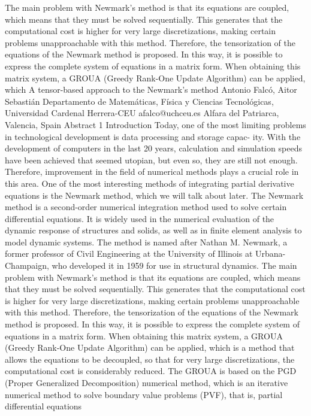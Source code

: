 \documentclass[a4paper, 10pt]{article}
\begin{document}
The main problem with Newmark's method is that its equations are coupled, which means that they must be solved sequentially. This generates that the computational cost is higher for very large discretizations, making certain problems unapproachable with this method. Therefore, the tensorization of the equations of the Newmark method is proposed. In this way, it is possible to express the complete system of equations in a matrix form. When obtaining this matrix system, a GROUA (Greedy Rank-One Update Algorithm) can be applied, which 
A tensor-based approach to the Newmark’s method
Antonio Falcó, Aitor Sebastián
Departamento de Matemáticas, Física y Ciencias Tecnológicas, Universidad Cardenal Herrera-CEU
afalco@uchceu.es
Alfara del Patriarca, Valencia, Spain
Abstract
1 Introduction
Today, one of the most limiting problems in technological development is data processing and storage capac-
ity. With the development of computers in the last 20 years, calculation and simulation speeds have been
achieved that seemed utopian, but even so, they are still not enough. Therefore, improvement in the field
of numerical methods plays a crucial role in this area. One of the most interesting methods of integrating
partial derivative equations is the Newmark method, which we will talk about later.
The Newmark method is a second-order numerical integration method used to solve certain differential
equations. It is widely used in the numerical evaluation of the dynamic response of structures and solids,
as well as in finite element analysis to model dynamic systems. The method is named after Nathan M.
Newmark, a former professor of Civil Engineering at the University of Illinois at Urbana-Champaign, who
developed it in 1959 for use in structural dynamics.
The main problem with Newmark’s method is that its equations are coupled, which means that they must
be solved sequentially. This generates that the computational cost is higher for very large discretizations,
making certain problems unapproachable with this method. Therefore, the tensorization of the equations of
the Newmark method is proposed. In this way, it is possible to express the complete system of equations in a
matrix form. When obtaining this matrix system, a GROUA (Greedy Rank-One Update Algorithm) can be
applied, which is a method that allows the equations to be decoupled, so that for very large discretizations,
the computational cost is considerably reduced.
The GROUA is based on the PGD (Proper Generalized Decomposition) numerical method, which is an
iterative numerical method to solve boundary value problems (PVF), that is, partial differential equations
\end{document}
